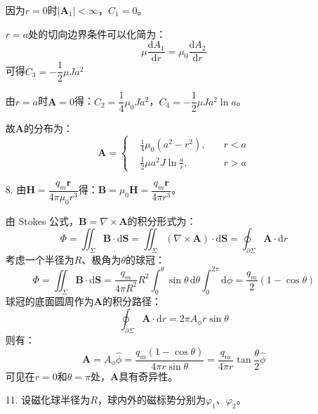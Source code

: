 \documentclass[a4paper,fontset=none]{ctexart}
\begin{document}
\begin{itemize}
    因为$r=0$时$|\bm{A}_1|<\infty$，$C_1=0$。

    $r=a$处的切向边界条件可以化简为：
    \[
    \mu\frac{\mathrm{d}A_1}{\mathrm{d}r} = \mu_0\frac{\mathrm{d}A_2}{\mathrm{d}r}
    \]
    可得$C_3=-\dfrac{1}{2}\mu Ja^2$
    
    由$r=a$时$\bm{A}=0$得：$C_2=\dfrac{1}{4}\mu_0 Ja^2$，$C_4=-\dfrac{1}{2}\mu Ja^2\ln a$。

    故$\bm{A}$的分布为：
    \[
    \bm{A} =
    \left\{
        \begin{aligned}
            &\frac{1}{4}\mu_0(a^2-r^2),\quad &r<a \\
            &\frac{1}{2}\mu a^2 J\ln\frac{a}{r},\quad &r>a
        \end{aligned}
    \right.
    \]

    \item[8.]
    由$\bm{H}=\dfrac{q_m\bm{r}}{4\pi\mu_0 r^3}$得：$\bm{B}=\mu_0\bm{H}=\dfrac{q_m\bm{r}}{4\pi r^3}$。

    由 Stokes 公式，$\bm{B}=\nabla\times\bm{A}$的积分形式为：
    \[
    \Phi = \iint_\Sigma \bm{B}\cdot\mathrm{d}\bm{S} = \iint_\Sigma (\nabla\times\bm{A})\cdot\mathrm{d}\bm{S} = \oint_{\partial\Sigma} \bm{A}\cdot\mathrm{d}r
    \]
    考虑一个半径为$R$、极角为$\theta$的球冠：
    \[
    \Phi = \iint_\Sigma \bm{B}\cdot\mathrm{d}\bm{S} = \frac{q_m}{4\pi R^2}R^2 \int_0^\theta \sin\theta\,\mathrm{d}\theta \int_0^{2\pi}\mathrm{d}\phi = \frac{q_m}{2}(1-\cos\theta)
    \]
    球冠的底面圆周作为$\bm{A}$的积分路径：
    \[
    \oint_{\partial\Sigma} \bm{A}\cdot\mathrm{d}r = 2\pi A_\phi r\sin\theta
    \]
    则有：
    \[
    \bm{A} = A_\phi\hat{\phi} = \frac{q_m(1-\cos\theta)}{4\pi r\sin\theta} = \frac{q_m}{4\pi r}\tan\frac{\theta}{2}\hat{\phi}
    \]
    可见在$r=0$和$\theta=\pi$处，$\bm{A}$具有奇异性。

    \item[11.]
    设磁化球半径为$R$，球内外的磁标势分别为$\varphi_1$、$\varphi_2$。


\end{itemize}
\end{document}
